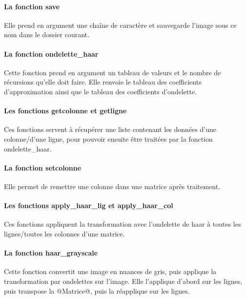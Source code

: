 \documentclass{article}
\begin{document}
\paragraph{La fonction save}

Elle prend en argument une chaîne de caractère et sauvegarde l'image sous ce nom dans le dossier courant.

\paragraph{La fonction ondelette\_{}haar}

Cette fonction prend en argument un tableau de valeurs et le nombre de récursions qu'elle doit faire. Elle renvoie le tableau des coefficients d'approximation ainsi que le tableau des coefficients d'ondelette.

\paragraph{Les fonctions getcolonne et getligne}

Ces fonctions servent à récupérer une liste contenant les données d'une colonne/d'une ligne, pour pouvoir ensuite être traitées par la fonction ondelette\_{}haar.


\paragraph{La fonction setcolonne}

Elle permet de remettre une colonne dans une matrice après traitement.

\paragraph{Les fonctions apply\_{}haar\_{}lig et apply\_{}haar\_{}col}

Ces fonctions appliquent la transformation avec l'ondelette de haar à toutes les lignes/toutes les colonnes d'une matrice.

\paragraph{La fonction haar\_{}grayscale}

Cette fonction convertit une image en nuances de gris, puis applique la transformation par ondelettes sur l'image. Elle l'applique d'abord sur les lignes, puis transpose la @Matrice@, puis la réapplique sur les lignes.
\end{document}
